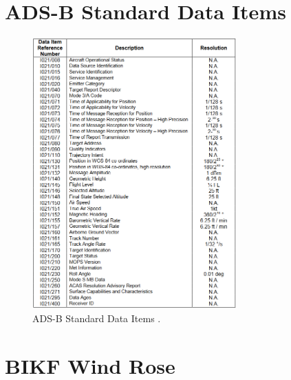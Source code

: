 \clearpage
\chapter{ADS-B Standard Data Items}\label{app:adsb_items}

\begin{figure}[h]
    \centering
    \includegraphics[width=0.7\textwidth]{graphics/ads_b_items.png}
    \caption[ADS-B Standard Data Items]{ADS-B Standard Data Items \cite[p. 8]{ASTERIX_ADS-B_specs}.}
    \label{fig:adsb_items}
\end{figure}


\clearpage
\chapter{BIKF Wind Rose}\label{app:wind_rose}

